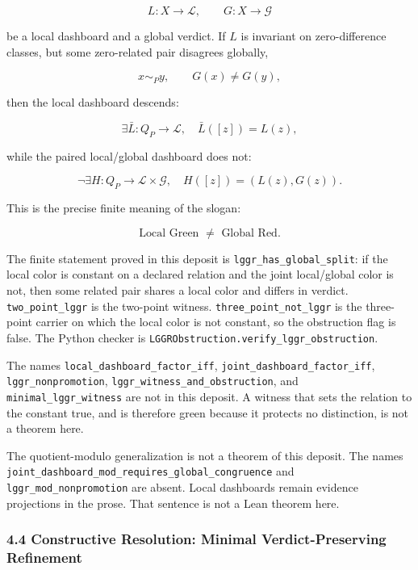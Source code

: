 \documentclass[
  10pt,
]{article}
\DeclareRobustCommand{\texttt}[1]{{\paperSymbolFont\nolinkurl{#1}}}
\begin{document}
\protect\hypertarget{math-E0051-0061}{}{\[
L:X\to\mathcal L,\qquad G:X\to\mathcal G
\]}

be a local dashboard and a global verdict. If \protect\hypertarget{math-E0052-0062}{}{\(L\)} is invariant on zero-difference classes, but some zero-related pair disagrees globally,

\protect\hypertarget{math-E0053-0063}{}{\[
x\sim_P y,\qquad G(x)\ne G(y),
\]}

then the local dashboard descends:

\protect\hypertarget{math-E0054-0064}{}{\[
\exists \bar L:Q_P\to\mathcal L,\quad
\bar L([z])=L(z),
\]}

while the paired local/global dashboard does not:

\protect\hypertarget{math-E0055-0065}{}{\[
\neg\exists H:Q_P\to\mathcal L\times\mathcal G,\quad
H([z])=(L(z),G(z)).
\]}

This is the precise finite meaning of the slogan:

\protect\hypertarget{math-E0056-0066}{}{\[
\boxed{
\text{Local Green } \ne \text{ Global Red}.
}
\]}

The finite statement proved in this deposit is \texttt{lggr\_has\_global\_split}: if the local color is constant on a declared relation and the joint local/global color is not, then some related pair shares a local color and differs in verdict. \texttt{two\_point\_lggr} is the two-point witness. \texttt{three\_point\_not\_lggr} is the three-point carrier on which the local color is not constant, so the obstruction flag is false. The Python checker is \texttt{LGGRObstruction.verify\_lggr\_obstruction}.

The names \texttt{local\_dashboard\_factor\_iff}, \texttt{joint\_dashboard\_factor\_iff}, \texttt{lggr\_nonpromotion}, \texttt{lggr\_witness\_and\_obstruction}, and \texttt{minimal\_lggr\_witness} are not in this deposit. A witness that sets the relation to the constant true, and is therefore green because it protects no distinction, is not a theorem here.

The quotient-modulo generalization is not a theorem of this deposit. The names \texttt{joint\_dashboard\_mod\_requires\_global\_congruence} and \texttt{lggr\_mod\_nonpromotion} are absent. Local dashboards remain evidence projections in the prose. That sentence is not a Lean theorem here.

\subsubsection{4.4 Constructive Resolution: Minimal Verdict-Preserving Refinement}\label{constructive-resolution-minimal-verdict-preserving-refinement}
\end{document}
